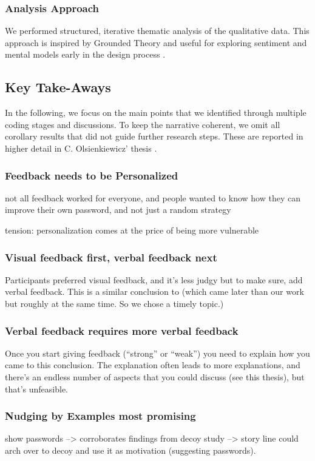 \subsubsection{Analysis Approach}
We performed structured, iterative thematic analysis of the qualitative data. This approach is inspired by Grounded  Theory and useful for exploring sentiment and mental models early in the design process \cite{Strauss1990}. 
\subsection{Key Take-Aways}
In the following, we focus on the main points that we identified through multiple coding stages and discussions. To keep the narrative coherent, we omit all corollary results that did not guide further research steps. These are reported in higher detail in C. Olsienkiewicz' thesis \cite{Olsienkiewicz2016BAThesis}. 
\subsubsection{Feedback needs to be Personalized}
not all feedback worked for everyone, and people wanted to know how they can improve their own password, and not just a random strategy

tension: personalization comes at the price of being more vulnerable
\subsubsection{Visual feedback first, verbal feedback next}
Participants preferred visual feedback, and it's less judgy but to make sure, add verbal feedback. This is a similar conclusion to \cite{Ur2017DataDrivenPWMeter} (which came later than our work but roughly at the same time. So we chose a timely topic.)

\subsubsection{Verbal feedback requires more verbal feedback}
Once you start giving feedback (``strong'' or ``weak'') you need to explain how you came to this conclusion. The explanation often leads to more explanations, and there's an endless number of aspects that you could discuss (see this thesis), but that's unfeasible. 


\subsubsection{Nudging by Examples most promising}
show passwords --> corroborates findings from decoy study --> story line could arch over to decoy and use it as motivation (suggesting passwords). 



